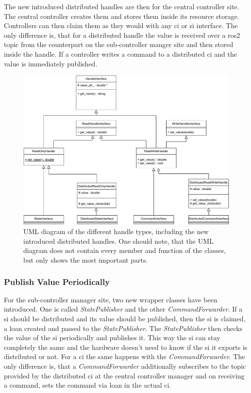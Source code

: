 The new introduced distributed \glspl{handle} are then for the central controller site. The central controller creates them and stores them inside its resource storage. Controllers can then claim them as they would with any \gls{ci} or \gls{si} interface. The only difference is, that for a distributed \gls{handle} the value is received over a \gls{ros2} topic from the counterpart on the sub-controller manger site and then stored inside the \gls{handle}. If a controller writes a command to a distributed \gls{ci} and the value is immediately published. \newline
\begin{figure}[htbp]
	\centering
	\includegraphics[width=1\textwidth]{Figures/c5/Handles_UML.pdf}
	\caption{UML diagram of the different \gls{handle} types, including the new introduced distributed \glspl{handle}. One should note, that the UML diagram does not contain every member and function of the classes, but only shows the most important parts. }
	\label{c5_fig_handle_uml}
\end{figure}
\subsubsection*{Publish Value Periodically}
For the sub-controller manager site, two new wrapper classes have been introduced. One is called \textit{StatePublisher} and the other \textit{CommandForwarder}. If a \gls{si} should be distributed and its value should be published, then the \gls{si} is claimed, a loan created and passed to the \textit{StatePublisher}. The \textit{StatePublisher} then checks the value of the \gls{si} periodically and publishes it. This way the \gls{si} can stay completely the same and the hardware doesn't need to know if the \gls{si} it exports is distributed or not. For a \gls{ci} the same happens with the \textit{CommandForwarder}. The only difference is, that a \textit{CommandForwarder} additionally subscribes to the topic provided by the distributed \gls{ci} at the central controller manager and on receiving a command, sets the command via loan in the actual \gls{ci}.

